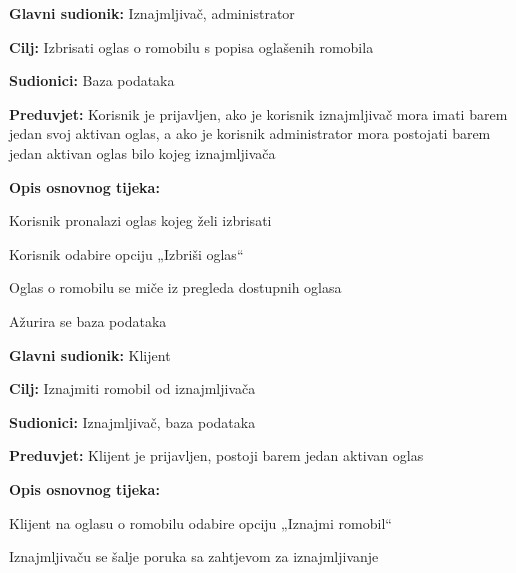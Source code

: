 						\begin{packed_item}
							
							\item \textbf{Glavni sudionik: }Iznajmljivač, administrator
							\item  \textbf{Cilj: }Izbrisati oglas o romobilu s popisa oglašenih romobila
							\item  \textbf{Sudionici: }Baza podataka
							\item  \textbf{Preduvjet: }Korisnik je prijavljen, ako je korisnik iznajmljivač mora imati barem jedan svoj aktivan oglas, a ako je korisnik administrator mora postojati barem jedan aktivan oglas bilo kojeg iznajmljivača
							\item  \textbf{Opis osnovnog tijeka:}
							
							\item[] \begin{packed_enum}
								\item Korisnik pronalazi oglas kojeg želi izbrisati
								\item Korisnik odabire opciju „Izbriši oglas“
								\item Oglas o romobilu se miče iz pregleda dostupnih oglasa
								\item Ažurira se baza podataka
								
							\end{packed_enum}	
						\end{packed_item}
						\noindent \underbar{\textbf{UC19 - Iznajmi romobil}}
						\begin{packed_item}
							
							\item \textbf{Glavni sudionik: }Klijent
							\item  \textbf{Cilj: }Iznajmiti romobil od iznajmljivača
							\item  \textbf{Sudionici: }Iznajmljivač, baza podataka
							\item  \textbf{Preduvjet: }Klijent je prijavljen, postoji barem jedan aktivan oglas
							\item  \textbf{Opis osnovnog tijeka:}
							
							\item[] \begin{packed_enum}
								\item Klijent na oglasu o romobilu odabire opciju „Iznajmi romobil“
								\item Iznajmljivaču se šalje poruka sa zahtjevom za iznajmljivanje
							
							\end{packed_enum}	
						\end{packed_item}
